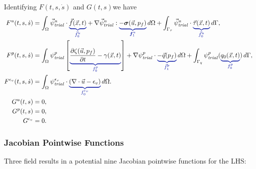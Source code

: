 Identifying $F(t,s,\dot{s})$ and $G(t,s)$we have
\begin{align}
  F^u(t,s,\dot{s}) &= \int_\Omega \trialvec[u] \cdot \eqnannotate{\vec{f}(\vec{x},t)}{\vec{f}^u_0}
                     + \nabla \trialvec[u] : \eqnannotate{-\tensor{\sigma}(\vec{u},p_f)}{\tensor{f}^u_1} \, d\Omega
                     + \int_{\Gamma_\tau} \trialvec[u] \cdot \eqnannotate{\vec{\tau}(\vec{x},t)}{\vec{f}^u_0} \, d\Gamma, \\
  F^p(t,s,\dot{s}) &= \int_\Omega  \trialscalar[p] \left[\eqnannotate{\frac{\partial \zeta(\vec{u},p_f)}{\partial t} - \gamma(\vec{x},t)} {f^p_0}\right]
                     + \nabla \trialscalar[p] \cdot \eqnannotate{-\vec{q}(p_f)}{\vec{f}^p_1} \, d\Omega
                     + \int_{\Gamma_q} \trialscalar[p] (\eqnannotate{q_0(\vec{x},t)}{f^p_0}) \, d\Gamma, \\
  F^{\epsilon_{v}}(t,s,\dot{s}) &= \int_{\Omega} \trialscalar[\epsilon_{v}] \cdot \eqnannotate{\left(\nabla \cdot \vec{u} - \epsilon_{v} \right)}{f^{\epsilon_{v}}_{0}} \, d\Omega. \\
  G^u(t,s) &= 0, \\
             G^p(t,s) &= 0, \\
 G^{\epsilon_v} &= 0.
\end{align}

\subsubsection{Jacobian Pointwise Functions}

Three field results in a potential nine Jacobian pointwise functions for the LHS:

